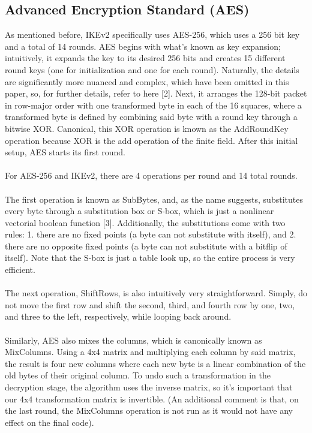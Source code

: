 \documentclass[runningheads]{llncs}
\begin{document}
\subsection{Advanced Encryption Standard (AES)}
As mentioned before, IKEv2 specifically uses AES-256, which uses a 256 bit key and a total of 14 rounds. AES begins with what’s known as key expansion; intuitively, it expands the key to its desired 256 bits and creates 15 different round keys (one for initialization and one for each round). Naturally, the details are significantly more nuanced and complex, which have been omitted in this paper, so, for further details, refer to here [2]. Next, it arranges the 128-bit packet in row-major order with one transformed byte in each of the 16 squares, where a transformed byte is defined by combining said byte with a round key through a bitwise XOR. Canonical, this XOR operation is known as the AddRoundKey operation because XOR is the add operation of the finite field. After this initial setup, AES starts its first round.\\
\\
For AES-256 and IKEv2, there are 4 operations per round and 14 total rounds.\\
\\
The first operation is known as SubBytes, and, as the name suggests, substitutes every byte through a substitution box or S-box, which is just a nonlinear vectorial boolean function [3]. Additionally, the substitutions come with two rules: 1. there are no fixed points (a byte can not substitute with itself), and 2. there are no opposite fixed points (a byte can not substitute with a bitflip of itself). Note that the S-box is just a table look up, so the entire process is very efficient.\\
\\
The next operation, ShiftRows, is also intuitively very straightforward. Simply, do not move the first row and shift the second, third, and fourth row by one, two, and three to the left, respectively, while looping back around.\\
\\
Similarly, AES also mixes the columns, which is canonically known as MixColumns. Using a 4x4 matrix and multiplying each column by said matrix, the result is four new columns where each new byte is a linear combination of the old bytes of their original column. To undo such a transformation in the decryption stage, the algorithm uses the inverse matrix, so it's important that our 4x4 transformation matrix is invertible. (An additional comment is that, on the last round, the MixColumns operation is not run as it would not have any effect on the final code).
\end{document}
